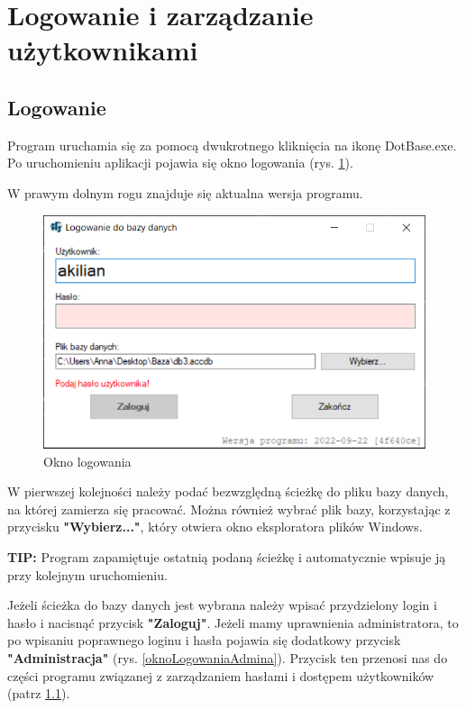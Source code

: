 
\rozdzial

\section{Logowanie i zarządzanie użytkownikami}

\subsection{Logowanie}

Program uruchamia się za pomocą dwukrotnego kliknięcia na ikonę DotBase.exe.
Po uruchomieniu aplikacji pojawia się okno logowania (rys. \ref{oknoLogowania}).

W prawym dolnym rogu znajduje się aktualna wersja programu.

\begin{figure}[htb]
	\centering
	\includegraphics{obrazki/Logowanie/logowanie.png}
	\caption{Okno logowania}
	\label{oknoLogowania}
\end{figure}

W pierwszej kolejności należy podać bezwzględną ścieżkę do pliku bazy danych, na której zamierza się pracować. Można również wybrać plik bazy, korzystając z przycisku \textbf{"Wybierz..."}, który otwiera okno eksploratora plików Windows. 

\textbf{TIP:} Program zapamiętuje ostatnią podaną ścieżkę i automatycznie wpisuje ją przy kolejnym uruchomieniu.

Jeżeli ścieżka do bazy danych jest wybrana należy wpisać przydzielony login i hasło i nacisnąć przycisk \textbf{"Zaloguj"}.
Jeżeli mamy uprawnienia administratora, to po wpisaniu poprawnego loginu i hasła pojawia się dodatkowy przycisk \textbf{"Administracja"} (rys. \ref{oknoLogowaniaAdmina}). Przycisk ten przenosi nas do części programu związanej z zarządzaniem hasłami i dostępem użytkowników (patrz \ref{}).

